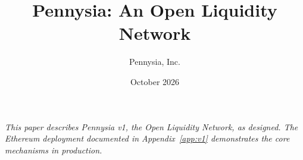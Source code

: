 \documentclass[10pt]{article}
\title{\textbf{Pennysia: An Open Liquidity Network}}
\author{Pennysia, Inc.}
\date{October 2026}
\begin{document}
\maketitle

\begin{abstract}
\noindent
\end{abstract}

\vspace{0.5em}
{\small\noindent\textit{This paper describes Pennysia v1, the Open Liquidity Network, as designed. The Ethereum deployment documented in Appendix~\ref{app:v1} demonstrates the core mechanisms in production.}}











\FloatBarrier
\appendix




\end{document}
